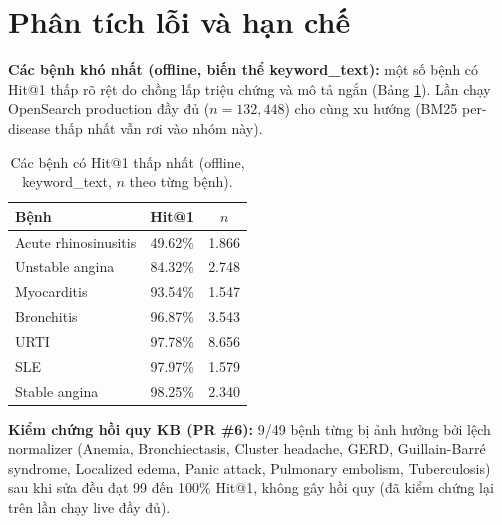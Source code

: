 
\section{Phân tích lỗi và hạn chế}
\label{sec:hanche}

\textbf{Các bệnh khó nhất (offline, biến thể keyword\_text):} một số bệnh có Hit@1 thấp rõ rệt do chồng lấp triệu chứng và mô tả ngắn (Bảng \ref{tab:hard}). Lần chạy OpenSearch production đầy đủ ($n=132{,}448$) cho cùng xu hướng (BM25 per-disease thấp nhất vẫn rơi vào nhóm này).

\begin{table}[H]
    \centering
    \small
    \caption{Các bệnh có Hit@1 thấp nhất (offline, keyword\_text, $n$ theo từng bệnh).}
    \label{tab:hard}
    \begin{tabular}{lcc}
        \hline
        \textbf{Bệnh}        & \textbf{Hit@1} & \textbf{$n$} \\
        \hline
        Acute rhinosinusitis & 49.62\%        & 1.866        \\
        Unstable angina      & 84.32\%        & 2.748        \\
        Myocarditis          & 93.54\%        & 1.547        \\
        Bronchitis           & 96.87\%        & 3.543        \\
        URTI                 & 97.78\%        & 8.656        \\
        SLE                  & 97.97\%        & 1.579        \\
        Stable angina        & 98.25\%        & 2.340        \\
        \hline
    \end{tabular}
\end{table}

\textbf{Kiểm chứng hồi quy KB (PR \#6):} 9/49 bệnh từng bị ảnh hưởng bởi lệch normalizer (Anemia, Bronchiectasis, Cluster headache, GERD, Guillain-Barré syndrome, Localized edema, Panic attack, Pulmonary embolism, Tuberculosis) sau khi sửa đều đạt 99 đến 100\% Hit@1, không gây hồi quy (đã kiểm chứng lại trên lần chạy live đầy đủ).

